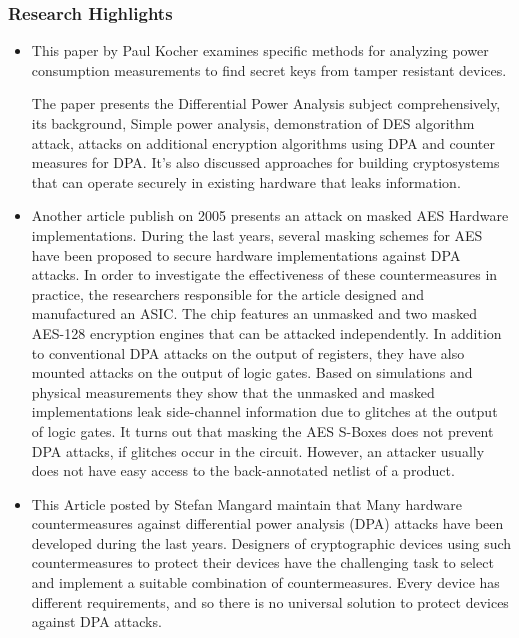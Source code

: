 \subsubsection{Research Highlights}

    \begin{itemize}
        \item   This paper \cite{kocher1999differential} by Paul Kocher examines specific methods for analyzing power consumption measurements to find secret keys from tamper resistant devices.
    
        The paper presents the Differential Power Analysis subject comprehensively, its background, Simple power analysis, demonstration of DES algorithm attack, attacks on additional encryption algorithms using DPA and counter measures for DPA.
        It’s also discussed approaches for building cryptosystems that can operate securely in existing hardware that leaks information.
        \item Another article publish on 2005 \cite{mangard2005successfully} presents an attack on masked AES Hardware implementations.
        During the last years, several masking schemes for AES have
        been proposed to secure hardware implementations against DPA attacks.
        In order to investigate the effectiveness of these countermeasures in practice,
        the researchers responsible for the article designed and manufactured an ASIC. The chip features an
        unmasked and two masked AES-128 encryption engines that can be attacked
        independently.
        In addition to conventional DPA attacks on the output of registers,
        they have also mounted attacks on the output of logic gates. Based on
        simulations and physical measurements they show that the unmasked and
        masked implementations leak side-channel information due to glitches
        at the output of logic gates. It turns out that masking the AES S-Boxes does not prevent DPA attacks, if glitches occur in the circuit. However, an attacker usually does not have easy access to the back-annotated
        netlist of a product.
        \item This Article posted by Stefan Mangard \cite{mangard2004hardware}
        maintain that  Many hardware countermeasures against differential power analysis (DPA) attacks have been developed during the last years. Designers of cryptographic devices using such countermeasures to protect their devices have the challenging task to select and implement a suitable combination of countermeasures. Every device has different requirements, and so there is no universal solution to protect devices against DPA attacks.


\end{itemize}
